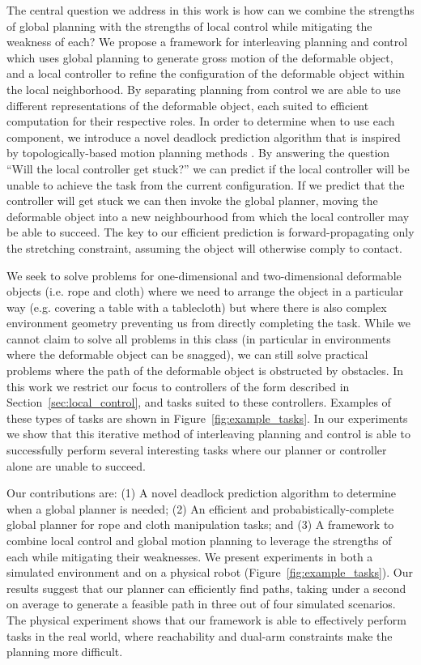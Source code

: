 The central question we address in this work is how can we combine the strengths of global planning with the strengths of local control while mitigating the weakness of each? We propose a framework for interleaving planning and control which uses global planning to generate gross motion of the deformable object, and a local controller to refine the configuration of the deformable object within the local neighborhood. By separating planning from control we are able to use different representations of the deformable object, each suited to efficient computation for their respective roles. In order to determine when to use each component, we introduce a novel deadlock prediction algorithm that is inspired by topologically-based motion planning methods \citep{Bhattacharya2012,Jaillet2008}. By answering the question ``Will the local controller get stuck?'' we can predict if the local controller will be unable to achieve the task from the current configuration. If we predict that the controller will get stuck we can then invoke the global planner, moving the deformable object into a new neighbourhood from which the local controller may be able to succeed. The key to our efficient prediction is forward-propagating only the stretching constraint, assuming the object will otherwise comply to contact.

We seek to solve problems for one-dimensional and two-dimensional deformable objects (i.e. rope and cloth) where we need to arrange the object in a particular way (e.g. covering a table with a tablecloth) but where there is also complex environment geometry preventing us from directly completing the task. While we cannot claim to solve all problems in this class (in particular in environments where the deformable object can be snagged), we can still solve practical problems where the path of the deformable object is obstructed by obstacles. In this work we restrict our focus to controllers of the form described in Section~\ref{sec:local_control}, and tasks suited to these controllers. Examples of these types of tasks are shown in Figure~\ref{fig:example_tasks}. In our experiments we show that this iterative method of interleaving planning and control is able to successfully perform several interesting tasks where our planner or controller alone are unable to succeed.

Our contributions are: (1) A novel deadlock prediction algorithm to determine when a global planner is needed; (2) An efficient and probabistically-complete global planner for rope and cloth manipulation tasks; and (3) A framework to combine local control and global motion planning to leverage the strengths of each while mitigating their weaknesses. We present experiments in both a simulated environment and on a physical robot (Figure~\ref{fig:example_tasks}). Our results suggest that our planner can efficiently find paths, taking under a second on average to generate a feasible path in three out of four simulated scenarios. The physical experiment shows that our framework is able to effectively perform tasks in the real world, where reachability and dual-arm constraints make the planning more difficult.

